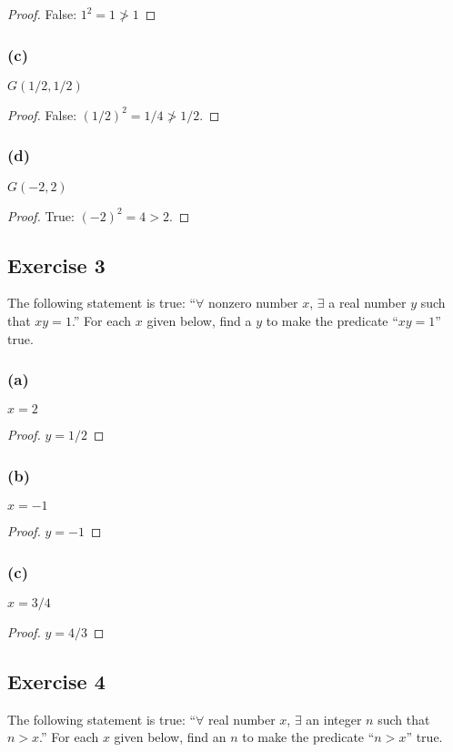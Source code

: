 \documentclass[14pt]{extarticle}
\newcommand{\fa}{\forall}
\newcommand{\te}{\exists}
\begin{document}
\begin{proof}
    False: $1^2 = 1 \ngtr 1$
\end{proof}

\subsubsection{(c)}
$G(1/2, 1/2)$

\begin{proof}
    False: $(1/2)^2 = 1/4 \ngtr 1/2$.
\end{proof}

\subsubsection{(d)}
$G(-2, 2)$

\begin{proof}
    True: $(-2)^2 = 4 > 2$.
\end{proof}

\subsection{Exercise 3}
The following statement is true: “$\fa$ nonzero number $x$, $\te$ a real number $y$ such that $xy = 1$.” For each $x$ given below, find a $y$ to make the predicate “$xy = 1$” true.

\subsubsection{(a)}
$x = 2$

\begin{proof}
    $y = 1/2$
\end{proof}

\subsubsection{(b)}
$x = -1$

\begin{proof}
    $y = -1$
\end{proof}

\subsubsection{(c)}
$x = 3/4$

\begin{proof}
    $y = 4/3$
\end{proof}

\subsection{Exercise 4}
The following statement is true: “$\fa$ real number $x$, $\te$ an integer $n$ such that $n > x$.” For each $x$ given below, find an $n$ to make the predicate “$n > x$” true.
\end{document}
